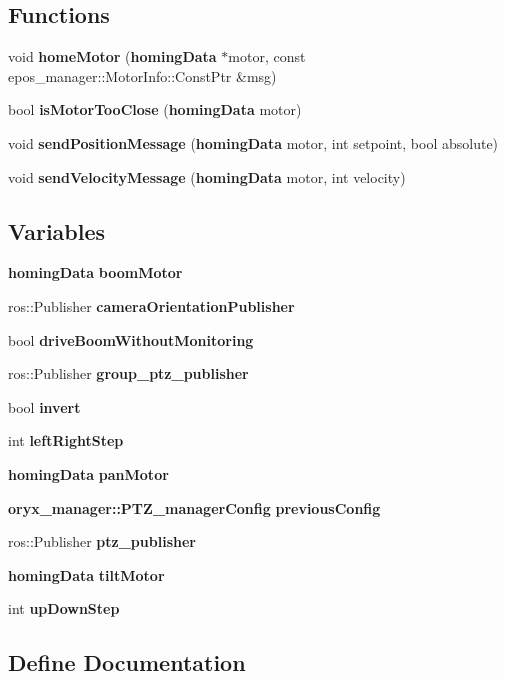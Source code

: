 \subsection*{\-Functions}
\begin{DoxyCompactItemize}
\item 
void {\bf home\-Motor} ({\bf homing\-Data} $\ast$motor, const epos\-\_\-manager\-::\-Motor\-Info\-::\-Const\-Ptr \&msg)
\item 
bool {\bf is\-Motor\-Too\-Close} ({\bf homing\-Data} motor)
\item 
void {\bf send\-Position\-Message} ({\bf homing\-Data} motor, int setpoint, bool absolute)
\item 
void {\bf send\-Velocity\-Message} ({\bf homing\-Data} motor, int velocity)
\end{DoxyCompactItemize}
\subsection*{\-Variables}
\begin{DoxyCompactItemize}
\item 
{\bf homing\-Data} {\bf boom\-Motor}
\item 
ros\-::\-Publisher {\bf camera\-Orientation\-Publisher}
\item 
bool {\bf drive\-Boom\-Without\-Monitoring}
\item 
ros\-::\-Publisher {\bf group\-\_\-ptz\-\_\-publisher}
\item 
bool {\bf invert}
\item 
int {\bf left\-Right\-Step}
\item 
{\bf homing\-Data} {\bf pan\-Motor}
\item 
{\bf oryx\-\_\-manager\-::\-P\-T\-Z\-\_\-manager\-Config} {\bf previous\-Config}
\item 
ros\-::\-Publisher {\bf ptz\-\_\-publisher}
\item 
{\bf homing\-Data} {\bf tilt\-Motor}
\item 
int {\bf up\-Down\-Step}
\end{DoxyCompactItemize}


\subsection{\-Define \-Documentation}
